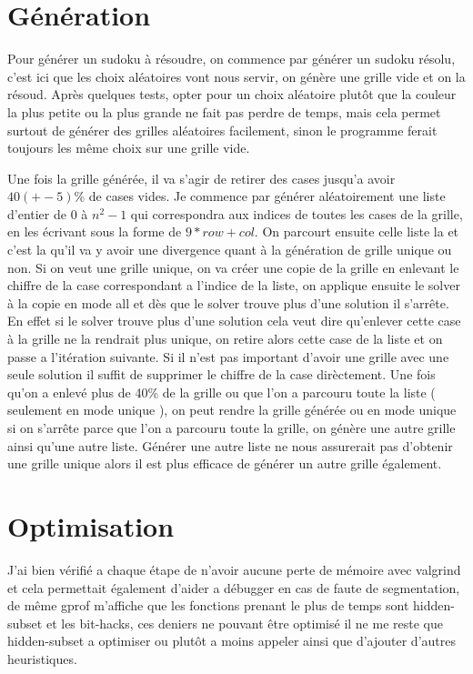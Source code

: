 \documentclass[11pt,a4paper]{article}
\begin{document}
\vspace{15}
\section{Génération}
\hspace{10} 
Pour générer un sudoku à résoudre, on commence par générer un sudoku résolu, c'est ici que les choix aléatoires vont nous servir, on génère une grille vide et on la résoud. Après quelques tests, opter pour un choix aléatoire plutôt que la couleur la plus petite ou la plus grande ne fait pas perdre de temps, mais cela permet surtout de générer des grilles aléatoires facilement, sinon le programme ferait toujours les même choix sur une grille vide. 

\hspace{10}
Une fois la grille générée, il va s'agir de retirer des cases jusqu'a avoir $40 (+-5)$\% de cases vides. Je commence par générer aléatoirement une liste d'entier de 0 à $n^2 - 1$ qui correspondra aux indices de toutes les cases de la grille, en les écrivant sous la forme de $9*row + col$. On parcourt ensuite celle liste la et c'est la qu'il va y avoir une divergence quant à la génération de grille unique ou non. Si on veut une grille unique, on va créer une copie de la grille en enlevant le chiffre de la case correspondant a l'indice de la liste, on applique ensuite le solver à la copie en mode all et dès que le solver trouve plus d'une solution il s'arrête. En effet si le solver trouve plus d'une solution cela veut dire qu'enlever cette case à la grille ne la rendrait plus unique, on retire alors cette case de la liste et on passe a l'itération suivante. Si il n'est pas important d'avoir une grille avec une seule solution il suffit de supprimer le chiffre de la case dirèctement. Une fois qu'on a enlevé plus de 40\% de la grille ou que l'on a parcouru toute la liste ( seulement en mode unique ), on peut rendre la grille générée ou en mode unique si on s'arrête parce que l'on a parcouru toute la grille, on génère une autre grille ainsi qu'une autre liste. Générer une autre liste ne nous assurerait pas d'obtenir une grille unique alors il est plus efficace de générer un autre grille également.

\vspace{40}
\section{Optimisation}
\hspace{10} 
J'ai bien vérifié a chaque étape de n'avoir aucune perte de mémoire avec valgrind et cela permettait également d'aider a débugger en cas de faute de segmentation, de même gprof m'affiche que les fonctions prenant le plus de temps sont hidden-subset et les bit-hacks, ces deniers ne pouvant être optimisé il ne me reste que hidden-subset a optimiser ou plutôt a moins appeler ainsi que d'ajouter d'autres heuristiques.
\end{document}
